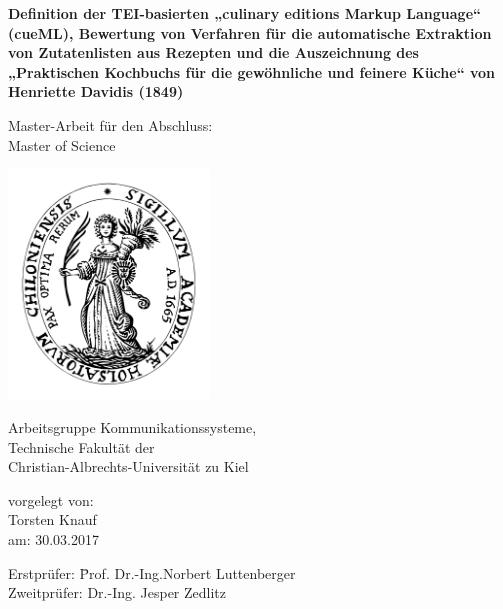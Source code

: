 \documentclass[12pt, twoside]{report}
\begin{document}
\begin{titlepage}
    \begin{center}
		\Large{
			\textbf{Definition der TEI-basierten „culinary editions Markup Language“ (cueML), Bewertung von Verfahren für die automatische Extraktion von Zutatenlisten aus Rezepten und die Auszeichnung des „Praktischen Kochbuchs für die gewöhnliche und feinere Küche“ von Henriette Davidis (1849)}
		}
		\vspace{0.5cm}
		
        \large
        Master-Arbeit für den Abschluss:\\
        Master of Science
        
        \vspace{0.5cm}
        
        \includegraphics[width=0.4\textwidth]{Images/cau-siegel.pdf}
        
        Arbeitsgruppe Kommunikationssysteme,\\
        Technische Fakultät der\\
        Christian-Albrechts-Universität zu Kiel\\
        
        \vspace{1cm}
        
            \large vorgelegt von:\\
            \Large Torsten Knauf\\
            \large am: 30.03.2017
    \end{center}
    
    \vspace{1cm}
    
    \Large
    \begin{tabbing}
    Erstprüfer:\hspace{0.5cm} \= Prof. Dr.-Ing.Norbert Luttenberger\\
    Zweitprüfer: \> Dr.-Ing. Jesper Zedlitz
    \end{tabbing}
\end{titlepage}
\end{document}
